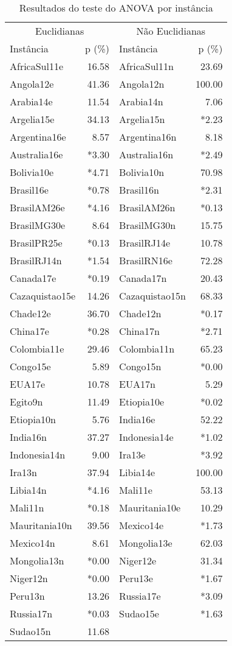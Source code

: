 \begin{table}[htb]
\caption{Resultados do teste do ANOVA por instância}
\label{tab:resultados_anova}
\begin{tabular}{@{}lr|lr@{}}
\toprule
\multicolumn{2}{c|}{Euclidianas}&\multicolumn{2}{|c}{Não Euclidianas}\\Inst\^ancia&p (\%)&Inst\^ancia&p (\%)\\\midrule
AfricaSul11e&16.58&AfricaSul11n&23.69\\
Angola12e&41.36&Angola12n&100.00\\
Arabia14e&11.54&Arabia14n&7.06\\
Argelia15e&34.13&Argelia15n&*2.23\\
Argentina16e&8.57&Argentina16n&8.18\\
Australia16e&*3.30&Australia16n&*2.49\\
Bolivia10e&*4.71&Bolivia10n&70.98\\
Brasil16e&*0.78&Brasil16n&*2.31\\
BrasilAM26e&*4.16&BrasilAM26n&*0.13\\
BrasilMG30e&8.64&BrasilMG30n&15.75\\
BrasilPR25e&*0.13&BrasilRJ14e&10.78\\
BrasilRJ14n&*1.54&BrasilRN16e&72.28\\
Canada17e&*0.19&Canada17n&20.43\\
Cazaquistao15e&14.26&Cazaquistao15n&68.33\\
Chade12e&36.70&Chade12n&*0.17\\
China17e&*0.28&China17n&*2.71\\
Colombia11e&29.46&Colombia11n&65.23\\
Congo15e&5.89&Congo15n&*0.00\\
EUA17e&10.78&EUA17n&5.29\\
Egito9n&11.49&Etiopia10e&*0.02\\
Etiopia10n&5.76&India16e&52.22\\
India16n&37.27&Indonesia14e&*1.02\\
Indonesia14n&9.00&Ira13e&*3.92\\
Ira13n&37.94&Libia14e&100.00\\
Libia14n&*4.16&Mali11e&53.13\\
Mali11n&*0.18&Mauritania10e&10.29\\
Mauritania10n&39.56&Mexico14e&*1.73\\
Mexico14n&8.61&Mongolia13e&62.03\\
Mongolia13n&*0.00&Niger12e&31.34\\
Niger12n&*0.00&Peru13e&*1.67\\
Peru13n&13.26&Russia17e&*3.09\\
Russia17n&*0.03&Sudao15e&*1.63\\
Sudao15n&11.68&\bottomrule
\end{tabular}
\end{table}
